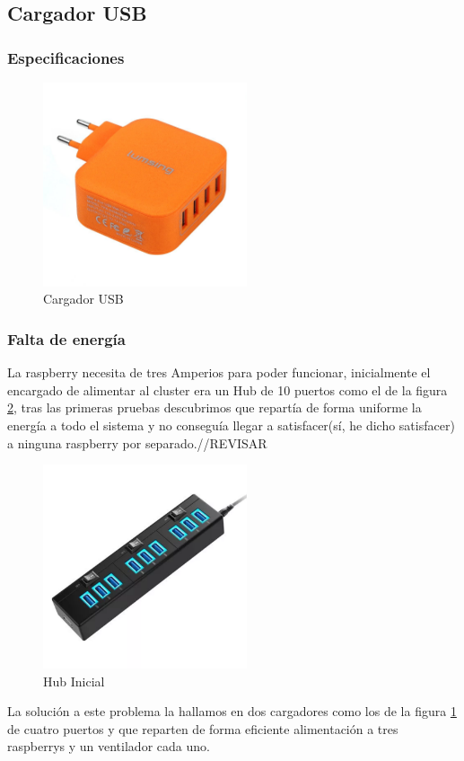 \subsection{Cargador USB}

\subsubsection{Especificaciones}
\begin{figure}[H]
	\centering
  	\includegraphics[width=60mm]{pics/cargadorUSB.jpg}
   	\caption[Cargador USB]{Cargador USB}
   \label{figure2.5}
\end{figure}

\subsubsection{Falta de energía}

La raspberry necesita de tres Amperios para poder funcionar, inicialmente el encargado de alimentar al cluster era un Hub de 10 puertos como el de la figura \ref{figure2.7}, tras las primeras pruebas descubrimos que repartía de forma uniforme la energía a todo el sistema y no conseguía llegar a satisfacer(sí, he dicho satisfacer) a ninguna raspberry por separado.//REVISAR


\begin{figure}[H]
	\centering
  	\includegraphics[width=60mm]{pics/Hub.PNG}
   	\caption[Problemas de energía]{Hub Inicial}
   \label{figure2.7}
\end{figure}


La solución a este problema la hallamos en dos cargadores como los de la figura \ref{figure2.5} de cuatro puertos y que reparten de forma eficiente alimentación a tres raspberrys y un ventilador cada uno.